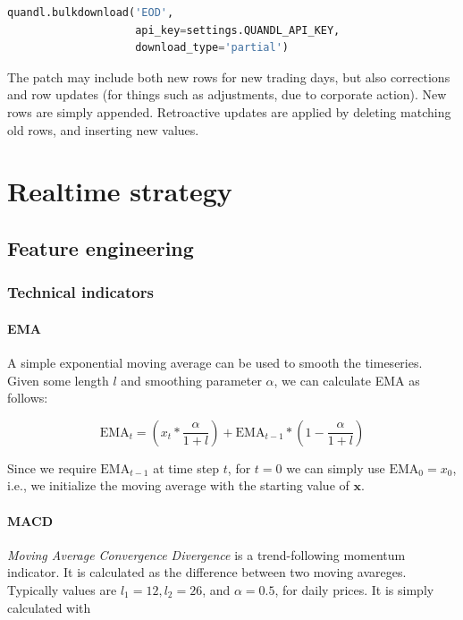 \documentclass[8pt,oneside]{book}
\newcommand{\vect}[1]{\boldsymbol{#1}}
\begin{document}
\begin{lstlisting}[language=Python]
quandl.bulkdownload('EOD',
                    api_key=settings.QUANDL_API_KEY,
                    download_type='partial')
\end{lstlisting}

The patch may include both new rows for new trading days, but also corrections and row updates (for things such
as adjustments, due to corporate action). New rows are simply appended. Retroactive updates are applied
by deleting matching old rows, and inserting new values.

\chapter{Realtime strategy}

\section{Feature engineering}

\subsection{Technical indicators}

\subsubsection{EMA}

A simple exponential moving average can be used to smooth the timeseries. Given some length $l$ and
smoothing parameter $\alpha$, we can calculate EMA as follows:

\begin{equation}
    \mathrm{EMA}_t = \left(x_t * \frac{\alpha}{1+l}\right) + \mathrm{EMA}_{t-1} * \left( 1 - \frac{\alpha}{1+l}\right)
\end{equation}

Since we require $\mathrm{EMA}_{t-1}$ at time step $t$, for $t=0$ we can simply use $\mathrm{EMA}_0 = x_0$, i.e.,
we initialize the moving average with the starting value of $\vect{x}$.

\subsubsection{MACD}

\emph{Moving Average Convergence Divergence} is a trend-following momentum indicator. It is calculated as
the difference between two moving avareges. Typically values are $l_1=12, l_2=26$, and $\alpha=0.5$, for
daily prices. It is simply calculated with
\end{document}
